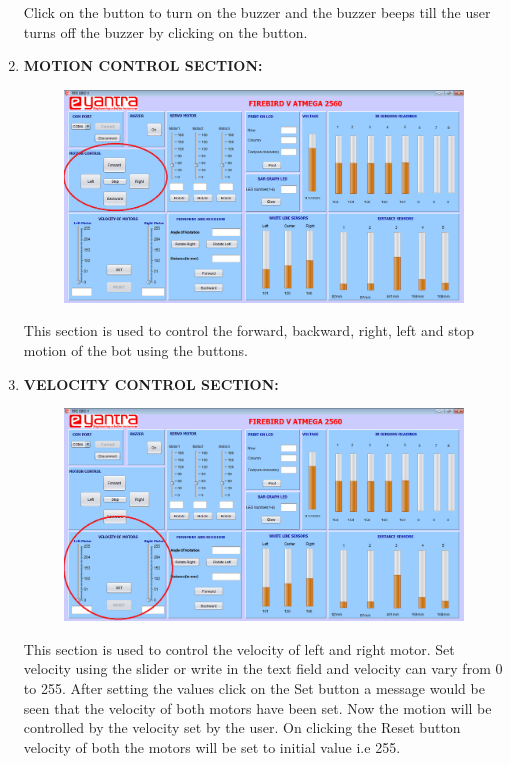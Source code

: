 \documentclass{article}
\begin{document}
\begin{enumerate}
\begin{figure}[h]
\begin{center}
			\end{center}
		\end{figure} 
		Click on the button to turn on the buzzer and the buzzer beeps till the user turns off the buzzer by clicking on the button.
		\item \textbf{MOTION CONTROL SECTION:} \\
		\begin{figure}[h]
			\begin{center}
				\includegraphics[scale=0.4]{motioncontrol.png}
			\end{center}
		\end{figure}
		This section is used to control the forward, backward, right, left and stop motion of the bot using the buttons.
		\newpage 
		\item \textbf{VELOCITY CONTROL SECTION:} \\
		\begin{figure}[h]
			\begin{center}
				\includegraphics[scale=0.4]{velocitycontrol.png}
			\end{center}
		\end{figure}
		This section is used to control the velocity of left and right motor. Set velocity using the slider or write in the text field and velocity can vary from 0 to 255. After setting the values click on the Set button a message would be seen that the velocity of both motors have been set. Now the motion will be controlled by the velocity set by the user. On clicking the Reset button velocity of both the motors will be set to initial value i.e 255.

\end{enumerate}
\end{document}
